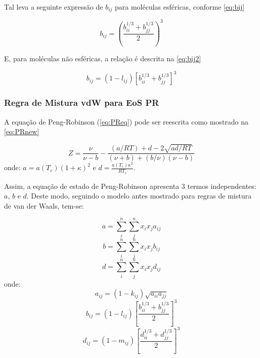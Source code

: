 Tal leva a seguinte expressão de $b_{ij}$ para moléculas esféricas, conforme
\autoref{eq:bij}

\begin{equation}\label{eq:bij}
b_{ij} = \left ( \frac{b_{ii}^{1/3} + b_{jj}^{1/3}}{2} \right )^3
\end{equation}

E, para moléculas não esféricas, a relação é descrita na \autoref{eq:bij2}

\begin{equation}\label{eq:bij2}
b_{ij} = (1 - l_{ij})\left [ b_{ii}^{1/3} + b_{jj}^{1/3} \right ]^3
\end{equation}

\subsubsection{Regra de Mistura vdW para EoS PR}

A equação de Peng-Robinson (\autoref{eq:PReq}) pode ser reescrita como mostrado
na \autoref{eq:PRnew}

\begin{equation}\label{eq:PRnew}
Z = \frac{\nu}{\nu - b} - \frac{(a/RT) + d - 2 \sqrt{ad/RT}}{(\nu + b) +
(b/\nu)(\nu - b)}
\end{equation}
onde: $a = a(T_c)(1 + \kappa)^2$ e $d =
\displaystyle\frac{a(T_c)\kappa^2}{RT_c}$.

Assim, a equação de estado de Peng-Robinson apresenta 3 termos
independentes: $a$, $b$ e $d$. Deste modo, seguindo o modelo antes mostrado para
regras de mistura de van der Waals, tem-se:

\begin{equation}\label{eq:PRnew1}
a = \displaystyle\sum_i^n\sum_j^nx_ix_ja_{ij}
\end{equation}
\begin{equation}\label{eq:PRnew2}
b = \displaystyle\sum_i^n\sum_j^nx_ix_jb_{ij}
\end{equation}
\begin{equation}\label{eq:PRnew3}
d = \displaystyle\sum_i^n\sum_j^nx_ix_jd_{ij}
\end{equation}
onde: 
\begin{equation}\label{eq:PRnew4}
a_{ij} = (1 - k_{ij})\sqrt{a_{ii}a_{jj}}
\end{equation}
\begin{equation}\label{eq:PRnew5}
b_{ij} = (1 - l_{ij})\left [ \frac{b_{ii}^{1/3} + b_{jj}^{1/3}}{2} \right]^3
\end{equation}
\begin{equation}\label{eq:PRnew6}
d_{ij} = (1 -m_{ij})\left [ \frac{d_{ii}^{1/3} + d_{jj}^{1/3}}{2} \right]^3
\end{equation}
